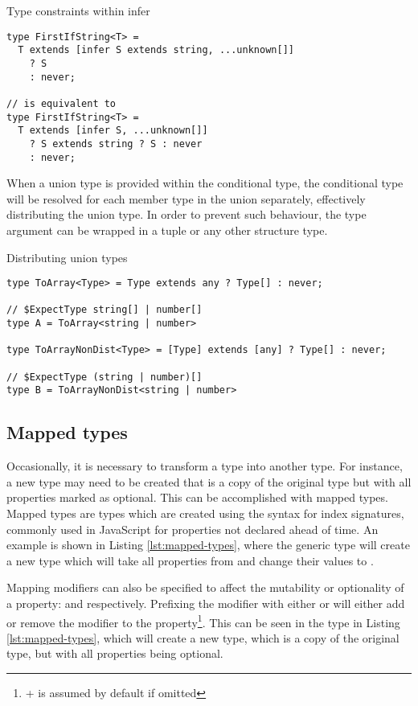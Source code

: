 \begin{listing}[ht]
  \caption{Type constraints within infer}\label{lst:infer-constraint}
  \begin{verbatim}
type FirstIfString<T> =
  T extends [infer S extends string, ...unknown[]]
    ? S
    : never;

// is equivalent to 
type FirstIfString<T> =
  T extends [infer S, ...unknown[]]
    ? S extends string ? S : never
    : never;
\end{verbatim}
\end{listing}

When a union type is provided within the conditional type, the conditional type will be resolved for each member type in the union separately, effectively distributing the union type. In order to prevent such behaviour, the type argument can be wrapped in a tuple or any other structure type.

\begin{listing}[ht]
  \caption{Distributing union types}\label{lst:distribute}
  \begin{verbatim}
type ToArray<Type> = Type extends any ? Type[] : never;

// $ExpectType string[] | number[]
type A = ToArray<string | number> 

type ToArrayNonDist<Type> = [Type] extends [any] ? Type[] : never;

// $ExpectType (string | number)[]
type B = ToArrayNonDist<string | number> 
\end{verbatim}
\end{listing}

\subsection{Mapped types}

Occasionally, it is necessary to transform a type into another type. For instance, a new type may need to be created that is a copy of the original type but with all properties marked as optional. This can be accomplished with mapped types. Mapped types are types which are created using the syntax for index signatures, commonly used in JavaScript for properties not declared ahead of time. An example is shown in Listing \ref{lst:mapped-types}, where the generic type  will create a new type which will take all properties from  and change their values to .

Mapping modifiers can also be specified to affect the mutability or optionality of a property:  and  respectively. Prefixing the modifier with either \code{+} or \code{-} will either add or remove the modifier to the property\footnote{+ is assumed by default if omitted}. This can be seen in the  type in Listing \ref{lst:mapped-types}, which will create a new type, which is a copy of the original type, but with all properties being optional.

